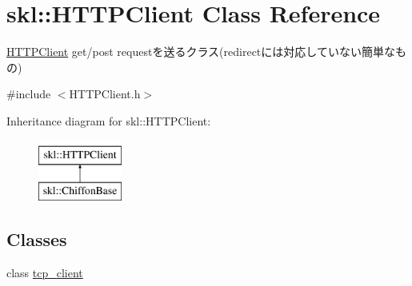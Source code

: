 \hypertarget{classskl_1_1_h_t_t_p_client}{}\section{skl\+:\+:H\+T\+T\+P\+Client Class Reference}
\label{classskl_1_1_h_t_t_p_client}


\hyperlink{classskl_1_1_h_t_t_p_client}{H\+T\+T\+P\+Client} get/post requestを送るクラス(redirectには対応していない簡単なもの)  




{\ttfamily \#include $<$H\+T\+T\+P\+Client.\+h$>$}

Inheritance diagram for skl\+:\+:H\+T\+T\+P\+Client\+:\begin{figure}[H]
\begin{center}
\leavevmode
\includegraphics[height=2.000000cm]{classskl_1_1_h_t_t_p_client}
\end{center}
\end{figure}
\subsection*{Classes}
\begin{DoxyCompactItemize}
\item 
class \hyperlink{classskl_1_1_h_t_t_p_client_1_1tcp__client}{tcp\+\_\+client}
\end{DoxyCompactItemize}
